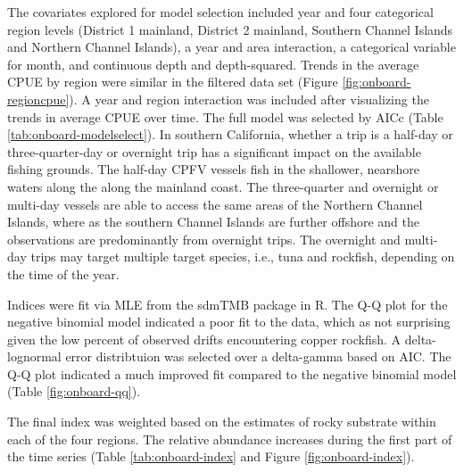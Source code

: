 \documentclass[11pt,
  english,
  letterpaper,
]{article}
\begin{document}
The covariates explored for model selection included year and four categorical region levels (District 1 mainland, District 2 mainland, Southern Channel Islands and Northern Channel Islands), a year and area interaction, a categorical variable for month, and continuous depth and depth-squared. Trends in the average CPUE by region were similar in the filtered data set (Figure \ref{fig:onboard-regioncpue}). A year and region interaction was included after visualizing the trends in average CPUE over time. The full model was selected by AICc (Table \ref{tab:onboard-modelselect}). In southern California, whether a trip is a half-day or three-quarter-day or overnight trip has a significant impact on the available fishing grounds. The half-day CPFV vessels fish in the shallower, nearshore waters along the along the mainland coast. The three-quarter and overnight or multi-day vessels are able to access the same areas of the Northern Channel Islands, where as the southern Channel Islands are further offshore and the observations are predominantly from overnight trips. The overnight and multi-day trips may target multiple target species, i.e., tuna and rockfish, depending on the time of the year.

Indices were fit via MLE from the sdmTMB package in R. The Q-Q plot for the negative binomial model indicated a poor fit to the data, which as not surprising given the low percent of observed drifts encountering copper rockfish. A delta-lognormal error distribtuion was selected over a delta-gamma based on AIC. The Q-Q plot indicated a much improved fit compared to the negative binomial model (Table \ref{fig:onboard-qq}).

The final index was weighted based on the estimates of rocky substrate within each of the four regions. The relative abundance increases during the first part of the time series (Table \ref{tab:onboard-index} and Figure \ref{fig:onboard-index}).

\newpage

\begingroup\fontsize{10}{12}\selectfont
\begingroup\fontsize{10}{12}\selectfont
\end{document}
